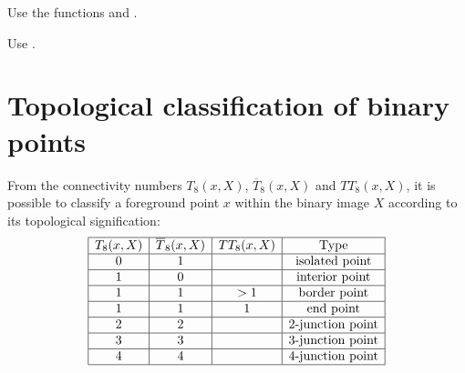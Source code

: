 \vspace*{-8pt}

\begin{mcomment}
\begin{mremark}
Use the functions  and .
\end{mremark}
\end{mcomment}

\begin{pcomment}
\begin{premark}
Use .
\end{premark}
\end{pcomment}


\section{Topological classification of binary points}
From the connectivity numbers $T_8(x,X)$, $\overline{T}_8(x,X)$ and $TT_8(x,X)$, it is possible to classify a foreground point $x$ within the binary image $X$ according to its topological signification:\vspace*{-8pt}
$$
\begin{array}{|c|c|c|c|}\hline
	T_8(x,X)&\overline{T}_8(x,X)&TT_8(x,X)&\text{Type}\\\hline
	0&1&&\text{isolated point}\\\hline
	1&0&&\text{interior point}\\\hline
	1&1&>1&\text{border point}\\\hline
	1&1&1&\text{end point}\\\hline
	2&2&&\text{2-junction point}\\\hline
	3&3&&\text{3-junction point}\\\hline
	4&4&&\text{4-junction point}\\\hline
\end{array}
$$



